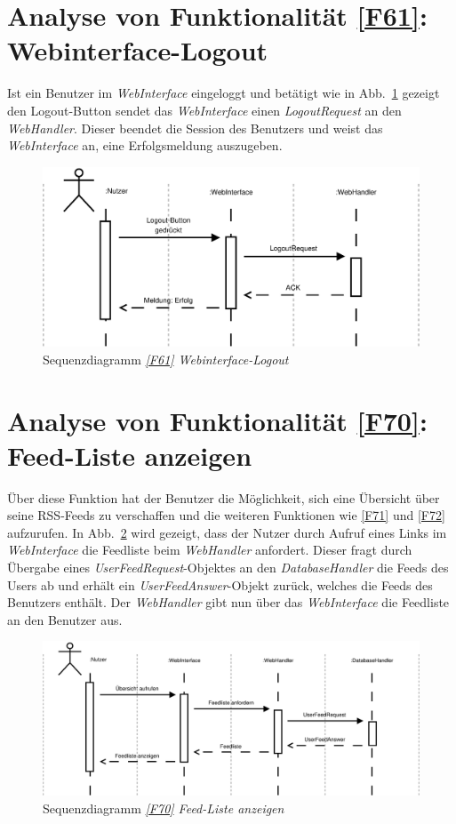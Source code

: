 \section{Analyse von Funktionalität \ref{F61}: Webinterface-Logout}

Ist ein Benutzer im \textit{WebInterface} eingeloggt und betätigt wie in Abb.~\ref{sd61} gezeigt den Logout-Button sendet das \textit{WebInterface} einen
\textit{LogoutRequest} an den \textit{WebHandler}. Dieser beendet die Session
des Benutzers und weist das \textit{WebInterface} an, eine Erfolgsmeldung
auszugeben.

\begin{figure}[h]
\centering
\includegraphics[width=.8\textwidth]{Systementwurf/02_produktfunktionsanalyse/f610}
\caption{Sequenzdiagramm \textit{\ref{F61} Webinterface-Logout}
\label{sd61}}
\end{figure}

\FloatBarrier

\section{Analyse von Funktionalität \ref{F70}: Feed-Liste anzeigen}

Über diese Funktion hat der Benutzer die Möglichkeit, sich eine Übersicht über seine
RSS-Feeds zu verschaffen und die weiteren Funktionen wie \ref{F71} und \ref{F72}
aufzurufen. In Abb.~\ref{sd70} wird gezeigt, dass der Nutzer durch Aufruf eines
Links im \textit{WebInterface} die Feedliste beim \textit{WebHandler} anfordert.
Dieser fragt durch Übergabe eines \textit{UserFeedRequest}-Objektes an den
\textit{DatabaseHandler} die Feeds des Users ab und erhält ein
\textit{UserFeedAnswer}-Objekt zurück, welches die Feeds des Benutzers enthält.
Der \textit{WebHandler} gibt nun über das \textit{WebInterface} die Feedliste an
den Benutzer aus.

\begin{figure}[h]
\centering
\includegraphics[width=1\textwidth]{Systementwurf/02_produktfunktionsanalyse/f700}
\caption{Sequenzdiagramm \textit{\ref{F70} Feed-Liste anzeigen}
\label{sd70}}
\end{figure}

